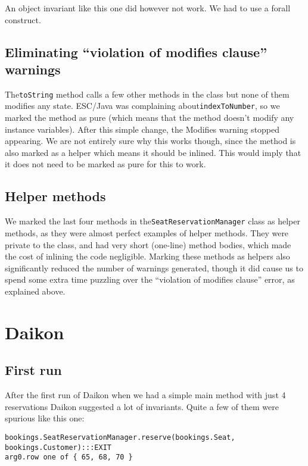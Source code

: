 \documentclass{article}
\begin{document}
An object invariant like this one did however not work. We had to use a forall construct.

\subsection{Eliminating ``violation of modifies clause'' warnings}

The\verb|toString| method calls a few other methods in the class but none of them modifies any state. ESC/Java was complaining about\verb|indexToNumber|, so we marked the method as pure (which means that the method doesn't modify any instance variables). After this simple change, the Modifies warning stopped appearing. We are not entirely sure why this works though, since the method is also marked as a helper which means it should be inlined. This would imply that it does not need to be marked as pure for this to work.

\subsection{Helper methods}

We marked the last four methods in the\verb|SeatReservationManager| class as helper methods, as they were almost perfect examples of helper methods. They were private to the class, and had very short (one-line) method bodies, which made the cost of inlining the code negligible. Marking these methods as helpers also significantly reduced the number of warnings generated, though it did cause us to spend some extra time puzzling over the ``violation of modifies clause'' error, as explained above.

\section{Daikon}

\subsection{First run}

After the first run of Daikon when we had a simple main method with just 4 reservations Daikon suggested a lot of invariants. Quite a few of them were spurious like this one:

\noindent
\begin{verbatim}
bookings.SeatReservationManager.reserve(bookings.Seat, bookings.Customer):::EXIT
arg0.row one of { 65, 68, 70 }
\end{verbatim}
\end{document}
